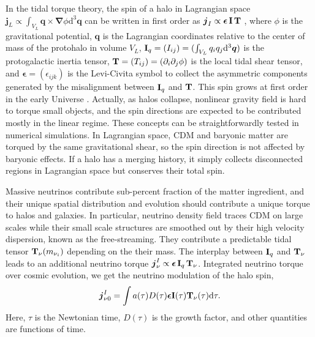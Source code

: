 \documentclass[aps,prd,twocolumn,amsmath,amssymb,amsfont,superscriptaddress]{revtex4-1}
\newcommand{\bs}{\boldsymbol}
\newcommand{\diff}{{\mathrm d}}
\begin{document}
In the tidal torque theory, the spin of a halo in Lagrangian space $\bs{j}_L\propto\int_{V_L}\bs{q}\times\bs{\nabla}\phi\diff^3\bs{q}$ 
can be written in first order as $\bs{j}_I\propto\bs{\epsilon}\,\bold{I}\,\bold{T}$ \citep{1984ApJ...286...38W}, 
where $\phi$ is the gravitational potential, $\bs{q}$ is the Lagrangian coordinates relative to the center of mass of the protohalo in volume $V_L$, 
$\bold{I}_q=(I_{ij})=(\int_{V_L} q_i q_j \diff^3\bs{q})$ is the protogalactic inertia tensor, 
$\bold{T}=(T_{ij})=(\partial_i\partial_j\phi)$ is the local tidal shear tensor, 
and $\bs{\epsilon}=(\epsilon_{ijk})$ is the Levi-Civita symbol to collect the asymmetric components generated by
the misalignment between $\bold{I}_q$ and $\bold{T}$. This spin grows at first order in the early Universe \citep{1984ApJ...286...38W}. 
Actually, as halos collapse, nonlinear gravity field is hard to torque small objects, and the spin directions are expected  to be contributed mostly in the linear regime. These concepts can be straightforwardly tested in numerical simulations. 
In Lagrangian space, CDM and baryonic matter are torqued by the same gravitational shear, so the spin direction is not affected by baryonic effects. 
If a halo has a merging history, it simply collects disconnected regions in Lagrangian space but conserves their total spin. 

Massive neutrinos contribute sub-percent fraction of the matter ingredient, and their unique spatial distribution and evolution should contribute a unique torque to halos and galaxies.
In particular, neutrino density field traces CDM on large scales while their small scale structures are smoothed out by their high velocity dispersion, known as the free-streaming. 
They contribute a predictable tidal tensor $\bold{T}_\nu(m_{\nu_i})$ depending on the their mass. 
The interplay between $\bold{I}_q$ and $\bold{T}_\nu$ leads to an additional neutrino torque $\bs{j}^I_\nu\propto\bs{\epsilon}\,\bold{I}_q\,\bold{T}_\nu$.
Integrated neutrino torque over cosmic evolution, we get the neutrino modulation of the halo spin,
\begin{equation}\label{eq.jnu0}
\bs{j}^I_{\nu 0}=\int a(\tau)D(\tau)\bs{\epsilon}\bold{I}(\tau)\bold{T}_\nu(\tau)\diff\tau.
\end{equation}
Here, $\tau$ is the Newtonian time, $D(\tau)$ is the growth factor, and other quantities are functions of time.
\end{document}
